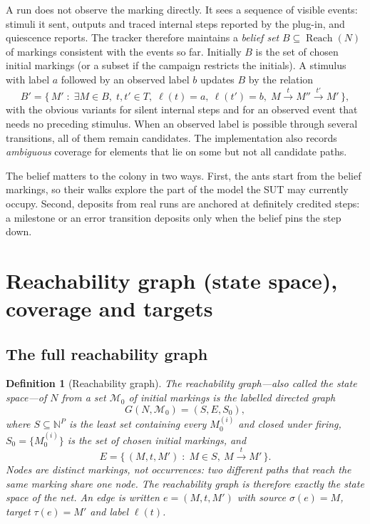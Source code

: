 \documentclass[11pt,a4paper]{article}
\newtheorem{definition}{Definition}[section]
\newcommand{\N}{\mathbb{N}}
\newcommand{\Reach}{\operatorname{Reach}}
\newcommand{\fir}[1]{\xrightarrow{#1}}
\begin{document}
A run does not observe the marking directly.  It sees a sequence of visible
events: stimuli it sent, outputs and traced internal steps reported by the
plug-in, and quiescence reports.  The tracker therefore maintains a
\emph{belief set} $B\subseteq\Reach(N)$ of markings consistent with the events
so far.  Initially $B$ is the set of chosen initial markings (or a subset if
the campaign restricts the initials).  A stimulus with label $a$ followed by
an observed label $b$ updates $B$ by the relation
\[
  B' = \bigl\{\,M'\;:\;\exists M\in B,\; t,t'\in T,\;
        \ell(t)=a,\ \ell(t')=b,\;
        M\fir{t}M''\fir{t'}M'\,\bigr\},
\]
with the obvious variants for silent internal steps and for an observed event
that needs no preceding stimulus.  When an observed label is possible through
several transitions, all of them remain candidates.  The implementation also
records \emph{ambiguous} coverage for elements that lie on some but not all
candidate paths.

The belief matters to the colony in two ways.  First, the ants start from the
belief markings, so their walks explore the part of the model the SUT may
currently occupy.  Second, deposits from real runs are anchored at definitely
credited steps: a milestone or an error transition deposits only when the
belief pins the step down.

\section{Reachability graph (state space), coverage and targets}\label{sec:rg}

\subsection{The full reachability graph}

\begin{definition}[Reachability graph]\label{def:rg}
The \emph{reachability graph}---also called the \emph{state space}---of
$N$ from a set $\mathcal{M}_0$ of initial markings is the labelled directed
graph
\[
  G(N,\mathcal{M}_0)=(S,E,S_0),
\]
where $S\subseteq\N^{P}$ is the least set containing every $M_0^{(i)}$ and
closed under firing, $S_0=\{M_0^{(i)}\}$ is the set of chosen initial
markings, and
\[
  E=\{\,(M,t,M')\;:\;M\in S,\ M\fir{t}M'\,\}.
\]
Nodes are distinct markings, not occurrences: two different paths that reach
the same marking share one node.  The reachability graph is therefore exactly
the state space of the net.  An edge is written $e=(M,t,M')$ with source
$\sigma(e)=M$, target $\tau(e)=M'$ and label $\ell(t)$.
\end{definition}
\end{document}
